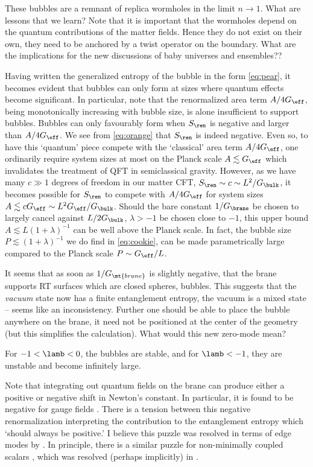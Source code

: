  These bubbles are a remnant of replica wormholes in the limit $n\to1$. What are lessons that we learn? Note that it is important that the wormholes depend on the quantum contributions of the matter fields. Hence they do not exist on their own, \ie they need to be anchored by a twist operator on the boundary.
What are the implications for the new discussions of baby universes and ensembles??

Having written the generalized entropy of the bubble in the form \eqref{eq:pear}, it becomes evident that bubbles can only form at sizes where quantum effects become significant. In particular, note that the renormalized area term $A/4 G_\eff$, being monotonically increasing with bubble size, is alone insufficient to support bubbles. Bubbles can only favourably form when $S_\ren$ is negative and larger than $A/4 G_\eff$. We see from \eqref{eq:orange} that $S_\ren$ is indeed negative. Even so, to have this `quantum' piece compete with the `classical' area term $A/4 G_\eff$, one ordinarily require system sizes at most on the Planck scale $A\lesssim G_\eff$ which invalidates the treatment of QFT in semiclassical gravity. However, as we have many $c\gg 1$ degrees of freedom in our matter CFT, $S_\ren \sim c \sim L^2/G_\bulk$, it becomes possible for $S_\ren$ to compete with $A/4 G_\eff$ for system sizes $A\lesssim c G_\eff \sim L^2 G_\eff/G_\bulk$. Should the bare constant $1/G_\brane$ be chosen to largely cancel against $L/2G_\bulk$, \ie $\lambda>-1$ be chosen close to $-1$, this upper bound $A\lesssim L (1+\lambda)^{-1}$ can be well above the Planck scale. In fact, the bubble size $P \lesssim (1+\lambda)^{-1}$ we do find in \eqref{eq:cookie}, can be made parametrically large compared to the Planck scale $P\sim G_\eff/L$.



 It seems that as soon as $1/G_\mt{brane}$ is slightly negative, that the brane supports RT surfaces which are closed spheres, \ie bubbles. This suggests that the {\it vacuum} state now has a finite entanglement entropy, \ie the vacuum is a mixed state -- seems like an inconsistency. Further one should be able to place the bubble anywhere on the brane, \ie it need not be positioned at the center of the geometry (but this simplifies the calculation). What would this new zero-mode mean?

For $-1<\lamb<0$, the bubbles are stable, and for $\lamb<-1$, they are unstable and become infinitely large.

Note that integrating out quantum fields on the brane can produce either a positive or negative shift in Newton's constant. In particular, it is found to be negative for gauge fields \cite{Larsen:1995ax,Kabat:1995eq}. There is a tension between this negative renormalization interpreting the contribution to the entanglement entropy which `should always be positive.' I believe this puzzle was resolved in terms of edge modes by \cite{Donnelly:2014fua,Donnelly:2015hxa}. In principle, there is a similar puzzle for non-minimally coupled scalars \cite{Larsen:1995ax}, which was resolved (perhaps implicitly) in \cite{Faulkner:2013ana}.


